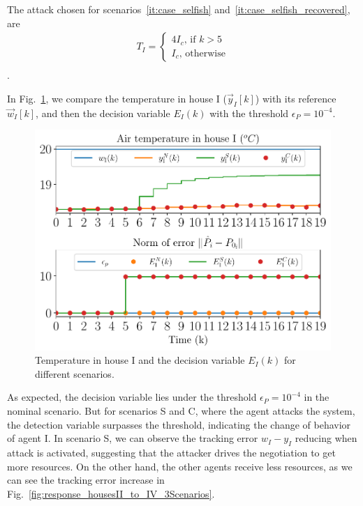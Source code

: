 \documentclass[../main.tex]{subfiles}
\begin{document}
The attack chosen for scenarios~\ref{it:case_selfish} and~\ref{it:case_selfish_recovered},
are
\begin{align}
  T_{I}=\begin{cases}
          4I_{c}\text{, if }k> 5\\
          I_{c}\text{, otherwise}
        \end{cases}\\
\end{align}
.

In Fig.~\ref{fig:response_houseI_3Scenarios}, we compare the temperature in house I ($\vec{y}_{I}[k]$) with its reference $\vec{w}_{I}[k]$, and then the
decision variable ${E_{I}(k)}$ with the threshold
$\epsilon_{P}=10^{-4}$.

\begin{figure}[h]
  \centering
  \includegraphics[width=.7\textwidth]{../img/resilient_eq/__ErrorWX_command_normErrH.pdf}
\caption{Temperature in house I and the decision variable $E_{I}(k)$ for different scenarios. }\label{fig:response_houseI_3Scenarios}
\end{figure}
As expected, the decision variable lies under the threshold $\epsilon_{P}=10^{-4}$ in the nominal scenario.
But for scenarios S and C, where the agent attacks the system, the detection variable surpasses the threshold, indicating the change of behavior of agent I.
In scenario S, we can observe the tracking error ${w_{I}-y_{I}}$ reducing when attack is activated, suggesting that the attacker drives the negotiation to get more resources.
On the other hand, the other agents receive less resources, as we can see the tracking error increase in Fig.~\ref{fig:response_housesII_to_IV_3Scenarios}.
\end{document}
